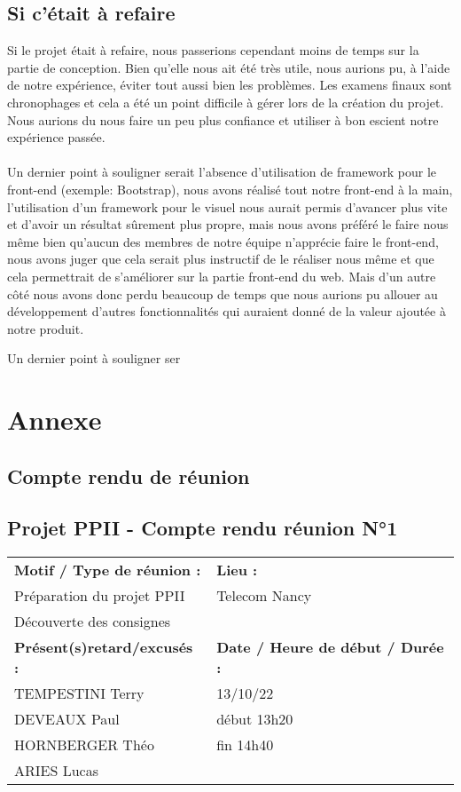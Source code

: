 \documentclass[12pt,titlepage]{report}
\begin{document}
\section{Si c'était à refaire}

Si le projet était à refaire, nous passerions cependant moins de temps sur la partie de conception. Bien qu’elle nous ait été très utile, nous aurions pu, à l’aide de notre expérience, éviter tout aussi bien les problèmes. Les examens finaux sont chronophages et cela a été un point difficile à gérer lors de la création du projet. Nous aurions du nous faire un peu plus confiance et utiliser à bon escient notre expérience passée.
\\ \\ 
Un dernier point à souligner serait l'absence d'utilisation de framework pour le front-end (exemple: Bootstrap), nous avons réalisé tout notre front-end à la main, l'utilisation d'un framework pour le visuel nous aurait permis d'avancer plus vite et d'avoir un résultat sûrement plus propre, mais nous avons préféré le faire nous même bien qu'aucun des membres de notre équipe n'apprécie faire le front-end, nous avons juger que cela serait plus instructif de le réaliser nous même et que cela permettrait de s'améliorer sur la partie front-end du web.
Mais d'un autre côté nous avons donc perdu beaucoup de temps que nous aurions pu allouer au développement d'autres fonctionnalités qui auraient donné de la valeur ajoutée à notre produit.

Un dernier point à souligner ser

\chapter{Annexe}


\newpage

\section{Compte rendu de réunion}
\section*{Projet PPII - Compte rendu réunion N°1}
\begin{tabular}{|p{7cm}|p{6cm}|}
    \hline
    \textbf{Motif / Type de réunion :}
    & \textbf{Lieu :}
    \\
    Préparation du projet PPII
    & 
    Telecom Nancy
    \\ 
    Découverte des consignes &
    \\\hline
    \textbf{Présent(s)retard/excusés :}
    &
    \textbf{Date / Heure de début / Durée :}
    \\ 
    TEMPESTINI Terry &  13/10/22\\  
    DEVEAUX Paul & début 13h20\\
    HORNBERGER Théo & fin 14h40\\
    ARIES Lucas & 
    \\ \hline
\end{tabular}
\end{document}
